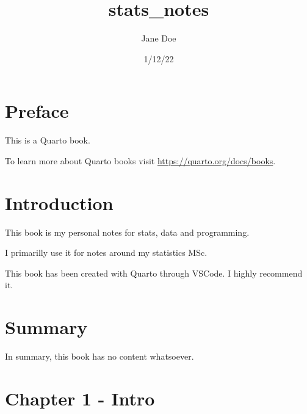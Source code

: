 \documentclass[
  letterpaper,
  DIV=11,
  numbers=noendperiod]{scrreprt}
\title{stats\_notes}
\author{Jane Doe}
\date{1/12/22}
\renewcommand*\contentsname{Table of contents}
\newcommand\contentsname{Table of contents}
\begin{document}
\maketitle
\ifdefined\Shaded\renewenvironment{Shaded}{\begin{tcolorbox}[enhanced, sharp corners, borderline west={3pt}{0pt}{shadecolor}, interior hidden, frame hidden, boxrule=0pt, breakable]}{\end{tcolorbox}}\fi

\renewcommand*\contentsname{Table of contents}
{
\hypersetup{linkcolor=}
\setcounter{tocdepth}{2}
\tableofcontents
}

\hypertarget{preface}{%
\chapter*{Preface}\label{preface}}


This is a Quarto book.

To learn more about Quarto books visit
\url{https://quarto.org/docs/books}.


\hypertarget{introduction}{%
\chapter{Introduction}\label{introduction}}

This book is my personal notes for stats, data and programming.

I primarilly use it for notes around my statistics MSc.

This book has been created with Quarto through VSCode. I highly
recommend it.


\hypertarget{summary}{%
\chapter{Summary}\label{summary}}

In summary, this book has no content whatsoever.


\hypertarget{chapter-1---intro}{%
\chapter{Chapter 1 - Intro}\label{chapter-1---intro}}
\end{document}

